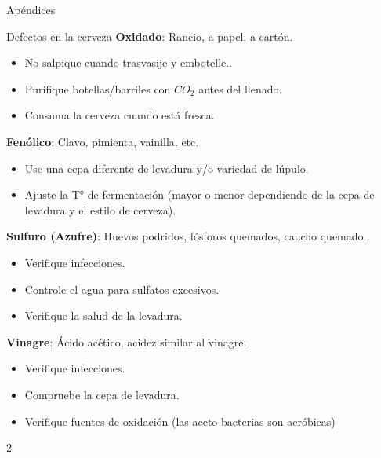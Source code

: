 \begin{frame}{Apéndices}
\begin{block}{Defectos en la cerveza}
\textbf{Oxidado}: Rancio, a papel, a cartón.

\begin{itemize}
\item
  No salpique cuando trasvasije y embotelle..
\item
  Purifique botellas/barriles con \(CO_{2}\) antes del llenado.
\item
  Consuma la cerveza cuando está fresca.
\end{itemize}

\textbf{Fenólico}: Clavo, pimienta, vainilla, etc.

\begin{itemize}
\item
  Use una cepa diferente de levadura y/o variedad de lúpulo.
\item
  Ajuste la T° de fermentación (mayor o menor dependiendo de la cepa de
  levadura y el estilo de cerveza).
\end{itemize}

\textbf{Sulfuro (Azufre)}: Huevos podridos, fósforos quemados, caucho
quemado.

\begin{itemize}
\item
  Verifique infecciones.
\item
  Controle el agua para sulfatos excesivos.
\item
  Verifique la salud de la levadura.
\end{itemize}

\textbf{Vinagre}: Ácido acético, acidez similar al vinagre.

\begin{itemize}
\item
  Verifique infecciones.
\item
  Compruebe la cepa de levadura.
\item
  Verifique fuentes de oxidación (las aceto-bacterias son aeróbicas)
\end{itemize}

2
\end{block}
\end{frame}


